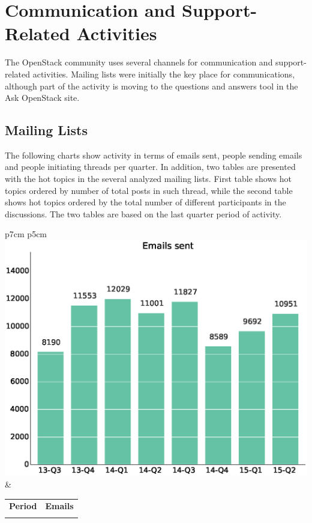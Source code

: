 \documentclass[a4wide,11pt]{report}
\begin{document}
\chapter{Communication and Support-Related Activities}

The OpenStack community uses several channels for communication and support-related activities. Mailing lists were initially the key place for communications, although part of the activity is moving to
the questions and answers tool in the Ask OpenStack site.

\section{Mailing Lists}

The following charts show activity in terms of emails sent, people sending emails and 
people initiating threads per quarter. In addition, two tables are presented with the hot
topics in the several analyzed mailing lists. First table shows hot topics ordered by
number of total posts in such thread, while the second table shows hot topics ordered by
the total number of different participants in the discussions. The two tables are
based on the last quarter period of activity.

\begin{tabular}{p{7cm} p{5cm}}
    \vspace{0pt} 
    \includegraphics[scale=.35]{figs/emails.eps}
    & 
    \vspace{0pt}
    \begin{tabular}{l|l}%
    \bfseries Period & \bfseries Emails %
    \csvreader[head to column names]{data/emails.csv}{}%
    {\\ & \emails}
    \end{tabular}
\end{tabular}
\end{document}
